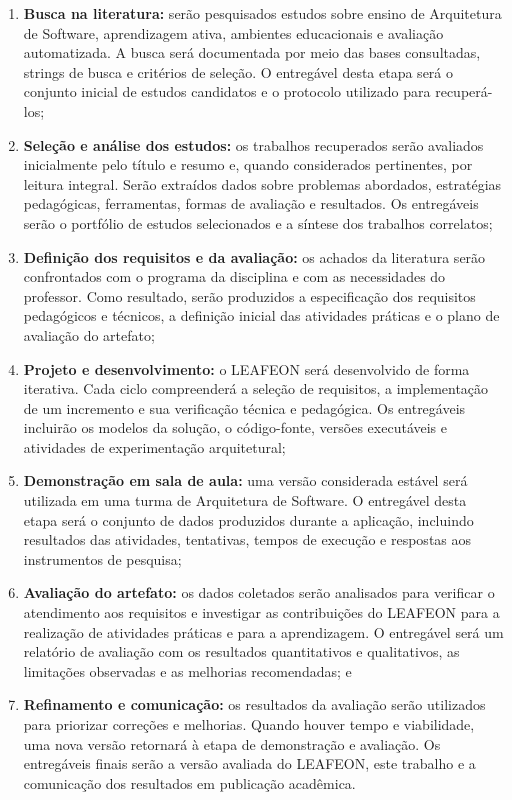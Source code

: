 \begin{enumerate}
    \item \textbf{Busca na literatura:} serão pesquisados estudos sobre ensino
    de Arquitetura de Software, aprendizagem ativa, ambientes educacionais e
    avaliação automatizada. A busca será documentada por meio das bases
    consultadas, strings de busca e critérios de seleção. O entregável desta
    etapa será o conjunto inicial de estudos candidatos e o protocolo utilizado
    para recuperá-los;

    \item \textbf{Seleção e análise dos estudos:} os trabalhos recuperados serão
    avaliados inicialmente pelo título e resumo e, quando considerados
    pertinentes, por leitura integral. Serão extraídos dados sobre problemas
    abordados, estratégias pedagógicas, ferramentas, formas de avaliação e
    resultados. Os entregáveis serão o portfólio de estudos selecionados e a
    síntese dos trabalhos correlatos;

    \item \textbf{Definição dos requisitos e da avaliação:} os achados da
    literatura serão confrontados com o programa da disciplina e com as
    necessidades do professor. Como resultado, serão produzidos a especificação
    dos requisitos pedagógicos e técnicos, a definição inicial das atividades
    práticas e o plano de avaliação do artefato;

    \item \textbf{Projeto e desenvolvimento:} o LEAFEON será desenvolvido de
    forma iterativa. Cada ciclo compreenderá a seleção de requisitos, a
    implementação de um incremento e sua verificação técnica e pedagógica. Os
    entregáveis incluirão os modelos da solução, o código-fonte, versões
    executáveis e atividades de experimentação arquitetural;

    \item \textbf{Demonstração em sala de aula:} uma versão considerada estável
    será utilizada em uma turma de Arquitetura de Software. O entregável desta
    etapa será o conjunto de dados produzidos durante a aplicação, incluindo
    resultados das atividades, tentativas, tempos de execução e respostas aos
    instrumentos de pesquisa;

    \item \textbf{Avaliação do artefato:} os dados coletados serão analisados
    para verificar o atendimento aos requisitos e investigar as contribuições
    do LEAFEON para a realização de atividades práticas e para a aprendizagem.
    O entregável será um relatório de avaliação com os resultados quantitativos
    e qualitativos, as limitações observadas e as melhorias recomendadas; e

    \item \textbf{Refinamento e comunicação:} os resultados da avaliação serão
    utilizados para priorizar correções e melhorias. Quando houver tempo e
    viabilidade, uma nova versão retornará à etapa de demonstração e avaliação.
    Os entregáveis finais serão a versão avaliada do LEAFEON, este trabalho e a
    comunicação dos resultados em publicação acadêmica.
\end{enumerate}

